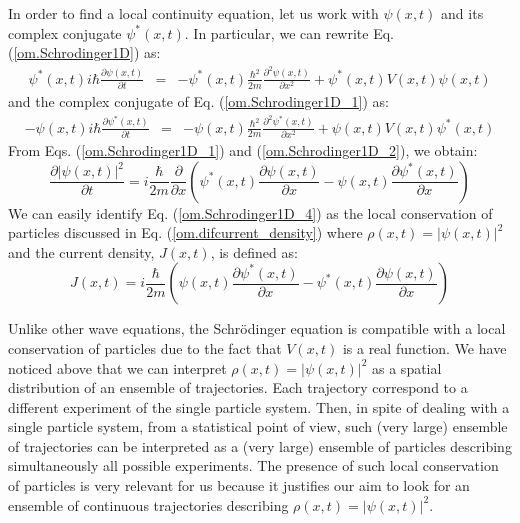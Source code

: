 \documentclass[nofootinbib, secnumarabic, amsmath, nobibnotes,10pt,aps,pra]{revtex4-1}
\newcommand{\eref}[1]{Eq. (\ref{#1})}
\begin{document}
In order to find a local continuity equation, let us work with $\psi(x,t)$ and its complex conjugate $\psi^*(x,t)$. In particular, we can rewrite \eref{om.Schrodinger1D} as:
\begin{eqnarray}
\psi^*(x,t) i \hbar \frac{\partial \psi(x,t)} {\partial t} &=& -\psi^*(x,t)\frac {\hbar^2} {2m} \frac{ {\partial}^2 \psi(x,t)} {\partial x^2}+ \psi^*(x,t) V(x,t) \psi(x,t)
\label{om.Schrodinger1D_1}
\end{eqnarray}
and the complex conjugate of \eref{om.Schrodinger1D_1} as:
\begin{eqnarray}
-\psi(x,t)i \hbar \frac{\partial \psi^*(x,t)} {\partial t} &=& -\psi(x,t)\frac {\hbar^2} {2m} \frac{ {\partial}^2 \psi^*(x,t)} {\partial x^2}+ \psi(x,t)V(x,t) \psi^*(x,t)
\label{om.Schrodinger1D_2}
\end{eqnarray}
From Eqs. (\ref{om.Schrodinger1D_1}) and (\ref{om.Schrodinger1D_2}), we obtain:
\begin{equation}
\label{om.Schrodinger1D_4}
 \frac{\partial |\psi(x,t)|^2} {\partial t} = i\frac {\hbar} {2m} \frac {\partial} {\partial x} \left(\psi^*(x,t) \frac{ {\partial} \psi(x,t)} {\partial x} - \psi(x,t) \frac{ {\partial} \psi^*(x,t)} {\partial x} \right)
\end{equation}
We can easily identify \eref{om.Schrodinger1D_4} as the local conservation of particles discussed in \eref{om.difcurrent_density} where $\rho(x,t) = |\psi(x,t)|^2$ and the current density, $J(x,t)$, is defined as:
\begin{equation}
\label{om.current}
J(x,t) = i \frac {\hbar} {2 m} \left(\psi(x,t) \frac {\partial \psi^{*}(x,t)} {\partial x}- \psi^{*}(x,t) \frac {\partial \psi(x,t)} {\partial x} \right)
\end{equation}

Unlike other  wave equations, the Schr\"odinger equation is compatible
with a local conservation of particles due to the fact that $V(x,t)$
is a real function. We have noticed above that we can interpret
$\rho(x,t) = |\psi(x,t)|^2$ as a spatial distribution of an ensemble
of trajectories. Each trajectory correspond to a different experiment of the single particle system. Then, in spite of dealing with a single particle system, from a statistical point of view, such (very large) ensemble of trajectories can be interpreted as a (very large) ensemble of particles describing simultaneously all possible experiments. The presence of such local
conservation of particles is very relevant for us because it
justifies our aim to look for an ensemble of continuous trajectories
describing $\rho(x,t) = |\psi(x,t)|^2$.
\end{document}
